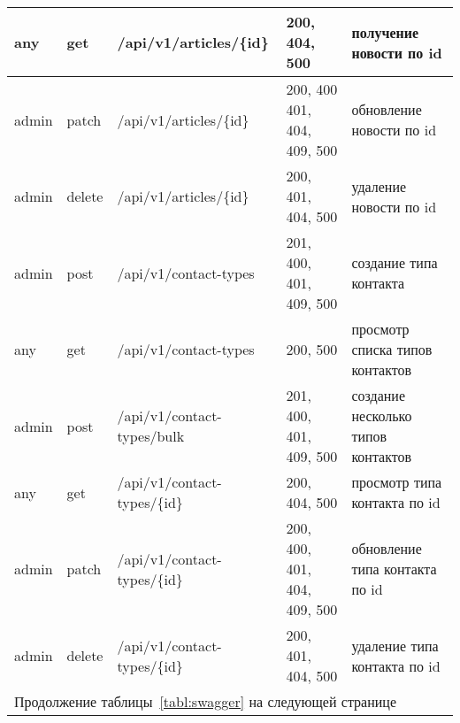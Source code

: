 \begin{sidewaystable}
\begin{tabular}{|p{1cm}|p{1cm}|p{8.5cm}|p{4.8cm}|p{8cm}|}
        any & get & /api/v1/articles/\{id\} & 200, 404, 500 & получение новости по id \\ \hline 
        admin & patch & /api/v1/articles/\{id\} & 200, 400 401, 404, 409, 500 & обновление новости по id \\ \hline 
        admin & delete & /api/v1/articles/\{id\} & 200, 401, 404, 500 & удаление новости по id \\ \hline  
        admin & post & /api/v1/contact-types & 201, 400, 401, 409, 500 & создание типа контакта \\ \hline 
        any & get & /api/v1/contact-types & 200, 500 & просмотр списка типов контактов \\ \hline 
        admin & post & /api/v1/contact-types/bulk & 201, 400, 401, 409, 500 & создание несколько типов контактов \\ \hline 
        any & get & /api/v1/contact-types/\{id\} & 200, 404, 500 & просмотр типа контакта по id \\ \hline 
        admin & patch & /api/v1/contact-types/\{id\} & 200, 400, 401, 404, 409, 500 & обновление типа контакта по id \\ \hline 
        admin & delete & /api/v1/contact-types/\{id\} & 200, 401, 404, 500 & удаление типа контакта по id \\ \hline 
        \multicolumn{5}{l}{Продолжение таблицы~\ref{tabl:swagger} на следующей странице}
    \end{tabular}
\end{sidewaystable}

